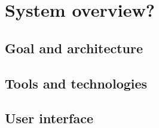 \chapter{System overview?}
\label{chap:system}

\section{Goal and architecture}
\label{sec:system:goal}

\section{Tools and technologies}
\label{sec:system:tools}

\section{User interface}
\label{sec:system:interface}